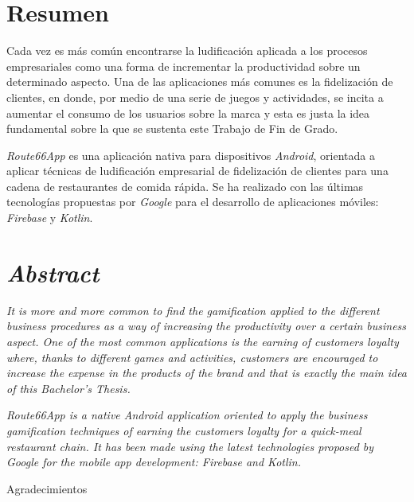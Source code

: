 \documentclass[twoside]{report}
\begin{document}
\newpage
\thispagestyle{empty}
\mbox{}

\clearpage


\section*{Resumen}

Cada vez es más común encontrarse la ludificación aplicada a los procesos empresariales como una forma de incrementar la productividad sobre un determinado aspecto. Una de las aplicaciones más comunes es la fidelización de clientes, en donde, por medio de una serie de juegos y actividades, se incita a aumentar el consumo de los usuarios sobre la marca y esta es justa la idea fundamental sobre la que se sustenta este Trabajo de Fin de Grado.

\textit{Route66App} es una aplicación nativa para dispositivos \textit{Android}, orientada a aplicar técnicas de ludificación empresarial de fidelización de clientes para una cadena de restaurantes de comida rápida. Se ha realizado con las últimas tecnologías propuestas por \textit{Google} para el desarrollo de aplicaciones móviles: \textit{Firebase} y \textit{Kotlin}.


\section*{\textit{Abstract}}


\textit{It is more and more common to find the gamification applied to the different business procedures as a way of increasing the productivity over a certain business aspect. One of the most common applications is the earning of customers loyalty where, thanks to different games and activities, customers are encouraged to increase the expense in the products of the brand and that is exactly the main idea of this Bachelor's Thesis.}

\textit{Route66App is a native Android application oriented to apply the business gamification techniques of earning the customers loyalty for a quick-meal restaurant chain. It has been made using the latest technologies proposed by Google for the mobile app development: Firebase and Kotlin.}

\clearpage


\hbox{}
\vspace{7cm}
\begin{huge}
Agradecimientos
\end{huge}
\end{document}
